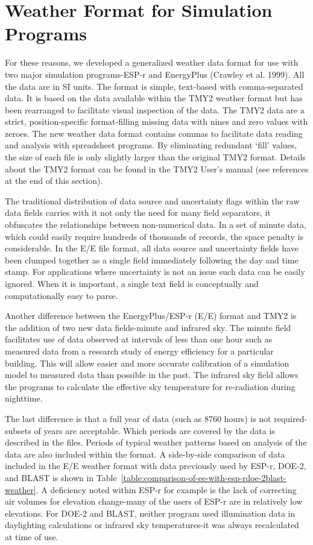 \section{Weather Format for Simulation Programs}\label{weather-format-for-simulation-programs}

For these reasons, we developed a generalized weather data format for use with two major simulation programs-ESP-r and EnergyPlus (Crawley et al. 1999). All the data are in SI units. The format is simple, text-based with comma-separated data. It is based on the data available within the TMY2 weather format but has been rearranged to facilitate visual inspection of the data. The TMY2 data are a strict, position-specific format-filling missing data with nines and zero values with zeroes. The new weather data format contains commas to facilitate data reading and analysis with spreadsheet programs. By eliminating redundant `fill' values, the size of each file is only slightly larger than the original TMY2 format. Details about the TMY2 format can be found in the TMY2 User's manual (see references at the end of this section).

The traditional distribution of data source and uncertainty flags within the raw data fields carries with it not only the need for many field separators, it obfuscates the relationships between non-numerical data. In a set of minute data, which could easily require hundreds of thousands of records, the space penalty is considerable. In the E/E file format, all data source and uncertainty fields have been clumped together as a single field immediately following the day and time stamp. For applications where uncertainty is not an issue such data can be easily ignored. When it is important, a single text field is conceptually and computationally easy to parse.

Another difference between the EnergyPlus/ESP-r (E/E) format and TMY2 is the addition of two new data fields-minute and infrared sky. The minute field facilitates use of data observed at intervals of less than one hour such as measured data from a research study of energy efficiency for a particular building. This will allow easier and more accurate calibration of a simulation model to measured data than possible in the past. The infrared sky field allows the programs to calculate the effective sky temperature for re-radiation during nighttime.

The last difference is that a full year of data (such as 8760 hours) is not required-subsets of years are acceptable. Which periods are covered by the data is described in the files. Periods of typical weather patterns based on analysis of the data are also included within the format. A side-by-side comparison of data included in the E/E weather format with data previously used by ESP-r, DOE-2, and BLAST is shown in Table~\ref{table:comparison-of-ee-with-esp-rdoe-2blast-weather}. A deficiency noted within ESP-r for example is the lack of correcting air volumes for elevation change-many of the users of ESP-r are in relatively low elevations. For DOE-2 and BLAST, neither program used illumination data in daylighting calculations or infrared sky temperatures-it was always recalculated at time of use.

